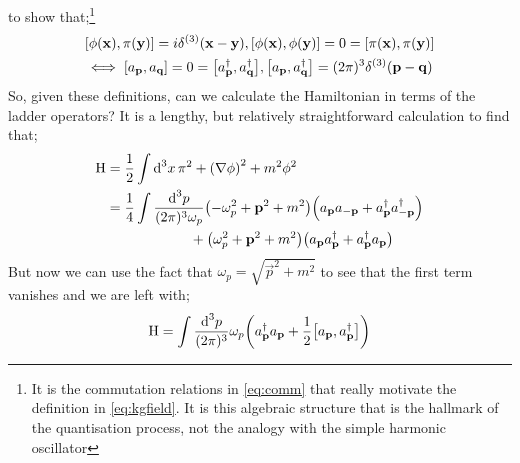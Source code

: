 to show that;\footnote{It is the commutation relations in \eqref{eq:comm} that really motivate the definition in \eqref{eq:kgfield}. It is this algebraic structure that is the hallmark of the quantisation process, not the analogy with the simple harmonic oscillator}
\begin{multline}
\label{eq:comm}
\left[\phi(\vec x), \pi(\vec y)\right] = i\delta^{(3)}(\vec x - \vec y), \left[\phi(\vec x), \phi(\vec y)\right] = 0 = \left[\pi(\vec x), \pi(\vec y)\right] \\ \iff \left[a_{\vec p}, a_{\vec q}\right] = 0 = \left[a_{\vec p}\dagg, a_{\vec q}\dagg\right], \left[a_{\vec p}, a_{\vec q}\dagg\right] = (2\pi)^3 \delta^{(3)}(\vec p - \vec q)
\end{multline}
So, given these definitions, can we calculate the Hamiltonian in terms of the ladder operators? It is a lengthy, but relatively straightforward calculation to find that;
\begin{align}
\text{H} &= \frac{1}{2} \int{\upd{^3 x} \pi^2 + \left(\nabla \phi\right)^2 + m^2 \phi^2} \nonumber \\
&= \frac{1}{4} \int{\frac{\ud^3 p}{(2\pi)^3 \omega_p}\left(-\omega_p^2 + \vec{p}^2 + m^2\right)\left(a_{\vec p} a_{-\vec p} + a_{\vec p}\dagg a_{-\vec p}\dagg\right)} \nonumber \\ 
&\qquad\qquad\qquad+ \left(\omega_p^2 + \vec{p}^2 + m^2\right)\left(a_{\vec p} a_{\vec p}\dagg + a_{\vec p}\dagg a_{\vec p}\right)
\end{align}
But now we can use the fact that $\omega_p = \sqrt{\vec{p}^2 + m^2}$ to see that the first term vanishes and we are left with;
\begin{equation}
\text{H} = \int{\frac{\ud^3 p}{(2\pi)^3} \omega_p \left(a_{\vec p}\dagg a_{\vec p} + \frac{1}{2}\left[a_{\vec p}, a_{\vec p}\dagg\right]\right)}
\end{equation}
